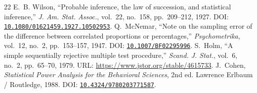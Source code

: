 \documentclass[11pt,letterpaper]{article}
\theoremstyle{remark}
\begin{document}
{\begin{thebibliography}{22}
 E.~B. Wilson, ``Probable inference, the law of succession, and statistical inference,'' \emph{J. Am. Stat. Assoc.}, vol.~22, no.~158, pp.~209--212, 1927. DOI: \href{https://doi.org/10.1080/01621459.1927.10502953}{\nolinkurl{10.1080/01621459.1927.10502953}}.
 Q.~McNemar, ``Note on the sampling error of the difference between correlated proportions or percentages,'' \emph{Psychometrika}, vol.~12, no.~2, pp.~153--157, 1947. DOI: \href{https://doi.org/10.1007/BF02295996}{\nolinkurl{10.1007/BF02295996}}.
 S.~Holm, ``A simple sequentially rejective multiple test procedure,'' \emph{Scand. J. Stat.}, vol.~6, no.~2, pp.~65--70, 1979. URL: \url{https://www.jstor.org/stable/4615733}.
 J.~Cohen, \emph{Statistical Power Analysis for the Behavioral Sciences}, 2nd ed. Lawrence Erlbaum / Routledge, 1988. DOI: \href{https://doi.org/10.4324/9780203771587}{\nolinkurl{10.4324/9780203771587}}.
\end{thebibliography}
}
\end{document}
